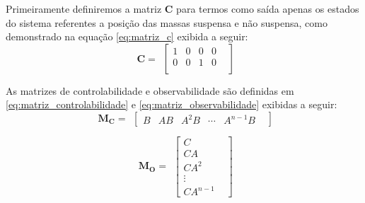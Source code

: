 \documentclass[a4paper]{ifacconf}
\begin{document}
    Primeiramente definiremos a matriz $\mathbf{C}$ para termos como saída apenas os estados do sistema referentes a posição das massas suspensa e não suspensa, como demonstrado na equação \ref{eq:matriz_c} exibida a seguir:
     \FloatBarrier
    \begin{equation} \label{eq:matriz_c}
        \begin{split}
             \mathbf{C}=
        \end{split}
        \begin{bmatrix}
            1&0&0&0&\\
            0&0&1&0&\\
        \end{bmatrix}
    \end{equation}
    
    As matrizes de controlabilidade e observabilidade são definidas em \ref{eq:matriz_controlabilidade} e \ref{eq:matriz_observabilidade} exibidas a seguir:
    \begin{equation} \label{eq:matriz_controlabilidade}
        \begin{split}
             \mathbf{M_C}=
        \end{split}
        \begin{bmatrix}
            B& AB& A^2B& \cdots& A^{n-1}B&
        \end{bmatrix}
    \end{equation}

    \begin{equation} \label{eq:matriz_observabilidade}
        \begin{split}
             \mathbf{M_O}=
        \end{split}
        \begin{bmatrix}
            C&\\
            CA&\\
            CA^2&\\
            \vdots&\\
            CA^{n-1}&
        \end{bmatrix}
    \end{equation}
\end{document}
